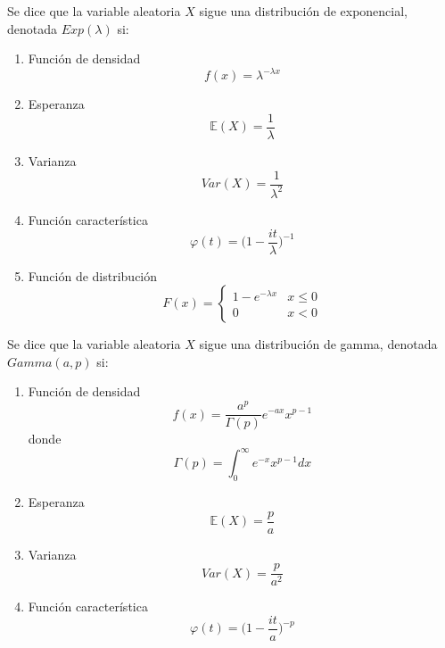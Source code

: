 \begin{ejr}[2.23 , Schaum]

\end{ejr}

\begin{ejr}[2.24 , Schaum]

\end{ejr}

\begin{ejr}[2.51 , Schaum]

\end{ejr}

\begin{defn}[Exponencial]
Se dice que la variable aleatoria $X$ sigue una distribución de exponencial, denotada $Exp(\lambda)$ si:
\begin{enumerate}[label=(\roman*)]
    \item Función de densidad \[ f(x) = \lambda^{-\lambda x} \]
    \item Esperanza \[ \mathbb{E}(X) = \frac{1}{\lambda} \]
    \item Varianza \[ Var(X) = \frac{1}{\lambda^2} \]
    \item Función característica \[ \varphi(t) = \bigg( 1 - \frac{it}{\lambda} \bigg)^{-1} \]
    \item Función de distribución \[ F(x)  = 
    \begin{cases} 
        1-e^{-\lambda x} & x\leq 0\\
        0 & x < 0
    \end{cases}\]
\end{enumerate}
\end{defn}

\begin{ejr}[2.35 , Schaum]

\end{ejr}

\begin{defn}[Gamma]
Se dice que la variable aleatoria $X$ sigue una distribución de gamma, denotada $Gamma(a,p)$ si:
\begin{enumerate}[label=(\roman*)]
    \item Función de densidad \[ f(x) = \frac{a^p}{\Gamma(p)}e^{-ax}x^{p-1}\] donde \[ \Gamma(p) = \int_0^\infty e^{-x}x^{p-1}dx \]
    \item Esperanza \[ \mathbb{E}(X) = \frac{p}{a} \]
    \item Varianza \[ Var(X) = \frac{p}{a^2} \]
    \item Función característica \[ \varphi(t) = \bigg( 1 - \frac{it}{a} \bigg)^{-p} \]
\end{enumerate}

\end{defn}

